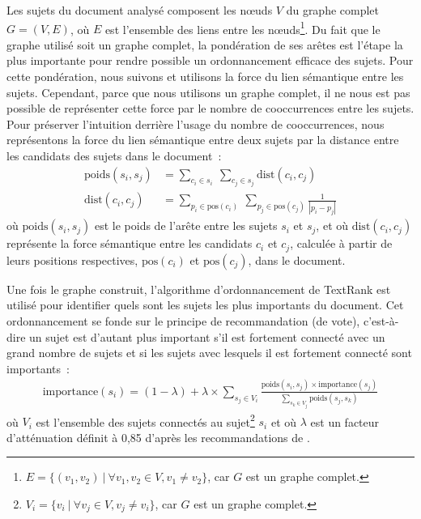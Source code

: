         Les sujets du document analysé composent les n\oe{}uds $V$ du graphe
        complet $G = (V, E)$, où $E$ est l'ensemble des liens entre les
        n\oe{}uds\footnote{$E = \{(v_1, v_2)\ |\ \forall{v_1, v_2 \in V}, v_1
        \neq v_2\}$, car $G$ est un graphe complet.}. Du fait que le graphe
        utilisé soit un graphe complet, la pondération de ses arêtes est l'étape
        la plus importante pour rendre possible un ordonnancement efficace des
        sujets. Pour cette pondération, nous suivons 
        et utilisons la force du lien sémantique entre les sujets. Cependant,
        parce que nous utilisons un graphe complet, il ne nous est pas possible
        de représenter cette force par le nombre de cooccurrences entre les
        sujets. Pour préserver l'intuition derrière l'usage du nombre de
        cooccurrences, nous représentons la force du lien sémantique entre deux
        sujets par la distance entre les candidats des sujets dans le document~:
        \begin{align}
          \text{poids}(s_i, s_j) &= \sum_{c_i \in s_i}\ \sum_{c_j \in s_j} \text{dist}(c_i, c_j) \label{math:ponderation}\\
          \text{dist}(c_i, c_j) &= \sum_{p_i \in \text{pos}(c_i)}\ \sum_{p_j \in \text{pos}(c_j)} \frac{1}{|p_i - p_j|} \label{math:distance}
        \end{align}
        où $\text{poids}(s_i, s_j)$ est le poids de l'arête entre les sujets
        $s_i$ et $s_j$, et où $\text{dist}(c_i, c_j)$ représente la force
        sémantique entre les candidats $c_i$ et $c_j$, calculée à partir de
        leurs positions respectives, $\text{pos}(c_i)$ et $\text{pos}(c_j)$,
        dans le document.

        Une fois le graphe construit, l'algorithme d'ordonnancement de TextRank
        est utilisé pour identifier quels sont les sujets les plus importants du
        document. Cet ordonnancement se fonde sur le principe de recommandation
        (de vote), c'est-à-dire un sujet est d'autant plus important s'il est
        fortement connecté avec un grand nombre de sujets et si les sujets avec
        lesquels il est fortement connecté sont importants~:
        \begin{align}
          \text{importance}(s_i) = (1 - \lambda) + \lambda \times \sum_{s_j \in V_i} \frac{\text{poids}(s_i, s_j) \times \text{importance}(s_j)}{\sum_{s_k \in V_j} \text{poids}(s_j, s_k)} \label{math:textrank}
        \end{align}
        où $V_i$ est l'ensemble des sujets connectés au sujet\footnote{$V_i =
        \{v_i\ |\ \forall{v_j \in V}, v_j \neq v_i\}$, car $G$ est un graphe
        complet.} $s_i$ et où $\lambda$ est un facteur d'atténuation définit à
        0,85 d'après les recommandations de .

